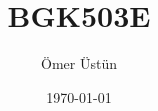 \documentclass[12pt]{article}
\begin{document}
\title{BGK503E}
\date{\today}
\author{Ömer Üstün}
\maketitle

\section*{}
\end{document}
